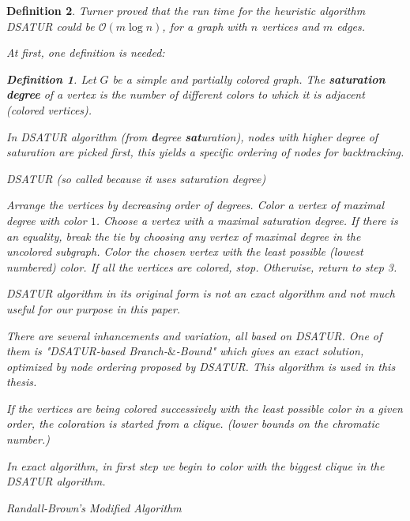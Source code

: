 \documentclass[12pt]{article}
\theoremstyle{slplain}
\newtheorem{defi}{Definition}
\begin{document}
\begin{defi}
Turner \cite{turner} proved that the run time for the heuristic algorithm DSATUR could be $\mathcal{O}(m \log n)$, for a graph with $n$ vertices and $m$ edges.

At first, one definition is needed:

\begin{defi}
Let $G$ be a simple and partially colored graph. The {\bf saturation degree} of a vertex is the number of different colors to which it is adjacent (colored vertices).\cite{brelaz}
\end{defi}

In DSATUR algorithm (from {\bf d}egree {\bf sat}uration), nodes with higher degree of saturation are picked first, this yields a specific ordering of nodes for backtracking.

\vspace{1cm}

\begin{algorithm}[H]
\SetAlgoLined
\DontPrintSemicolon
  \caption{DSATUR (so called because it uses saturation degree)\cite{brelaz}}

  Arrange the vertices by decreasing order of degrees.\;
   Color a vertex of maximal degree with color $1$.\;
  Choose a vertex with a maximal saturation degree. If there is an
equality, break the tie by choosing any vertex of maximal degree in the uncolored
subgraph.\;
    Color the chosen vertex with the least possible (lowest numbered)
color.\;
  If all the vertices are colored, stop. Otherwise, return to step 3.\;
 
\end{algorithm}

\newpage

DSATUR algorithm in its original form is not an exact algorithm and not much useful for our purpose in this paper. 

There are several inhancements and variation, all based on DSATUR. One of them is "DSATUR-based Branch-$\&$-Bound" which gives an exact solution, optimized by node ordering proposed by DSATUR. This algorithm is used in this thesis.

If the vertices are being colored successively with the least possible color in a
given order, the coloration is started from a clique. (lower bounds on the 
chromatic number.)

In exact algorithm, in first step we begin to color with the biggest clique in the DSATUR algorithm.



\newpage
{}
\begin{algorithm}[H]
\SetAlgoLined
\DontPrintSemicolon
  \caption{Randall-Brown's Modified Algorithm\cite{randall}}
  

\end{algorithm}
\end{defi}
\end{document}
